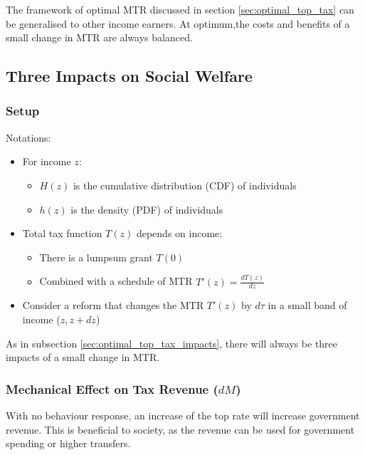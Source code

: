         The framework of optimal MTR discussed in section \ref{sec:optimal_top_tax} can be generalised to other income earners. At optimum,the costs and benefits of a small change in MTR are always balanced.

    \subsection{Three Impacts on Social Welfare}

        \subsubsection{Setup}
        
        Notations:

        \begin{itemize}
            \item For income $z$:
            \begin{itemize}
                \item $H(z)$ is the cumulative distribution (CDF) of individuals
                \item $h(z)$ is the density (PDF) of individuals
            \end{itemize}
            \item Total tax function $T(z)$ depends on income:
            \begin{itemize}
                \item There is a lumpsum grant $T(0)$
                \item Combined with a schedule of MTR $T'(z)=\frac{dT(z)}{dz}$
            \end{itemize}
            \item Consider a reform that changes the MTR $T'(z)$ by $d\tau$ in a small band of income ($z,z+dz$)
        \end{itemize}

        As in subsection \ref{sec:optimal_top_tax_impacts}, there will always be three impacts of a small change in MTR.
        
        \subsubsection{Mechanical Effect on Tax Revenue ($dM$)}

            With no behaviour response, an increase of the top rate will increase government revenue. This is beneficial to society, as the revenue can be used for government spending or higher transfers.

